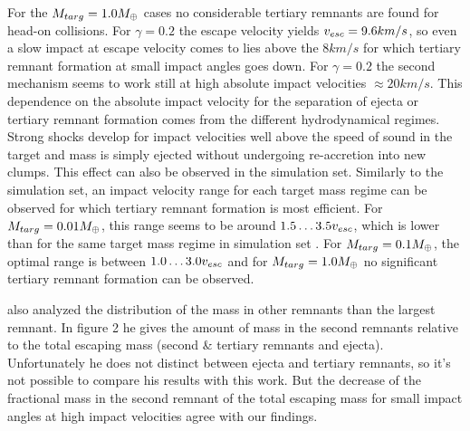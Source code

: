 For the $M_{targ} = 1.0 M_{\oplus}$ cases no considerable tertiary remnants are found for head-on collisions. For $\gamma = 0.2$ the escape velocity yields $v_{esc} = 9.6 km/s$, so even a slow impact at escape velocity comes to lies above the $8 km/s$ for which tertiary remnant formation at small impact angles goes down. For $\gamma = 0.2$ the second mechanism seems to work still at high absolute impact velocities $\approx 20km/s$. This dependence on the absolute impact velocity for the separation of ejecta or tertiary remnant formation comes from the different hydrodynamical regimes. Strong shocks develop for impact velocities well above the speed of sound in the target and mass is simply ejected without undergoing re-accretion into new clumps. This effect can also be observed in the \iss simulation set. Similarly to the \css simulation set, an impact velocity range for each target mass regime can be observed for which tertiary remnant formation is most efficient. For $M_{targ} = 0.01 M_{\oplus}$, this range seems to be around $1.5 \dots 3.5 v_{esc}$, which is lower than for the same target mass regime in simulation set \css. For $M_{targ} = 0.1 M_{\oplus}$, the optimal range is between $1.0 \dots 3.0 v_{esc}$ and for $M_{targ} = 1.0 M_{\oplus}$ no significant tertiary remnant formation can be observed.

\cite{Agnor:2004p3329} also analyzed the distribution of the mass in other remnants than the largest remnant. In figure 2 he gives the amount of mass in the second remnants relative to the total escaping mass (second \& tertiary remnants and ejecta). Unfortunately he does not distinct between ejecta and tertiary remnants, so it's not possible to compare his results with this work. But the decrease of the fractional mass in the second remnant of the total escaping mass for small impact angles at high impact velocities agree with our findings.

